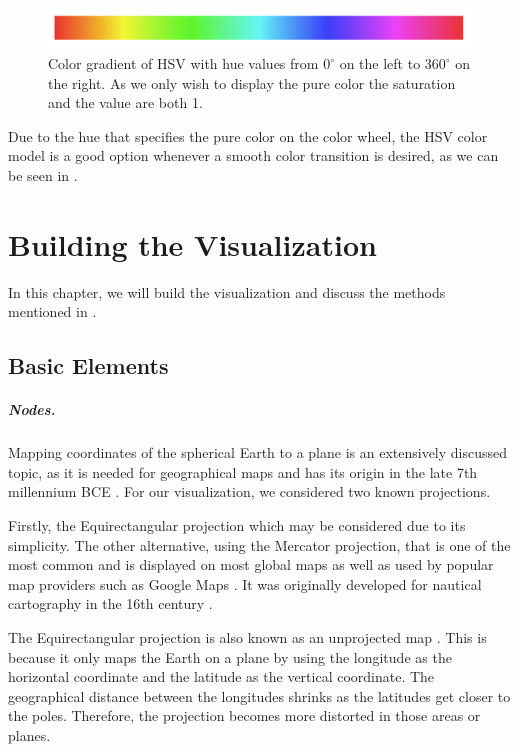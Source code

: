 \documentclass
[
    paper = a4,
    pagesize,
    12 pt,
    oneside,                       %
    open = right,
    DIV = calc,
    BCOR = 0 mm,                   %
    bibtotoc
]
{scrbook}
\begin{document}
\begin{figure}[H]
  \begin{minipage}{\textwidth}
    \includegraphics[width=\textwidth]{Images/hsv.png}
    \caption[]{Color gradient of HSV with hue values from $0^\circ$ on the left to $360^\circ$ on the right. As we only wish to display the pure color the saturation and the value are both 1.}
    \label{fig:hsv}
    \end{minipage}
\end{figure}

Due to the hue that specifies the pure color on the color wheel, the HSV color model is a good option whenever a smooth color transition is desired, as we can be seen in  .

\chapter{Building the Visualization} \label{main}

In this chapter, we will build the visualization and discuss the methods mentioned in .

\section{Basic Elements} \label{graph}

\paragraph{Nodes.}
Mapping coordinates of the spherical Earth to a plane is an extensively discussed topic, as it is needed for geographical maps and has its origin in the late 7th millennium BCE \cite{cartography}.
For our visualization, we considered two known projections.

Firstly, the Equirectangular projection which may be considered due to its simplicity.
The other alternative, using the Mercator projection, that is one of the most common and is displayed on most global maps as well as used by popular map providers such as Google Maps \cite{google_maps}.
It was originally developed for nautical cartography in the 16th century \cite{mercator}.

The Equirectangular projection is also known as an unprojected map \cite{equirectangular}.
This is because it only maps the Earth on a plane by using the longitude as the horizontal coordinate and the latitude as the vertical coordinate.
The geographical distance between the longitudes shrinks as the latitudes get closer to the poles.
Therefore, the projection becomes more distorted in those areas or planes.
\end{document}
